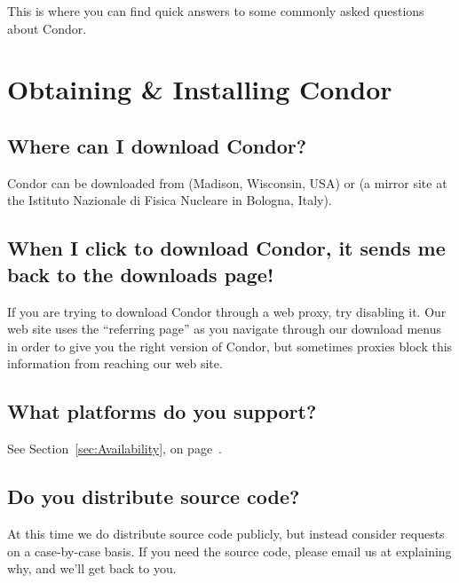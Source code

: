 
This is where you can find quick answers to some commonly asked
questions about Condor.

\section{Obtaining \& Installing Condor}

\subsection{Where can I download Condor?}

Condor can be downloaded from
 (Madison, Wisconsin,
USA) or  (a mirror
site at the Istituto Nazionale di Fisica Nucleare in Bologna, Italy).

\subsection{When I click to download Condor, it sends me back to the downloads page!}

If you are trying to download Condor through a web proxy, try
disabling it.
Our web site uses the ``referring page'' as you navigate through our
download menus in order to give you the right version of Condor, but
sometimes proxies block this information from reaching our web site.

\subsection{What platforms do you support?}

See Section~\ref{sec:Availability}, on
page~\pageref{sec:Availability}.


\subsection{Do you distribute source code?}

At this time we do  distribute source code publicly, but
instead consider requests on a case-by-case basis.
If you need the source code, please email us at
 explaining why, and we'll get back to
you.

